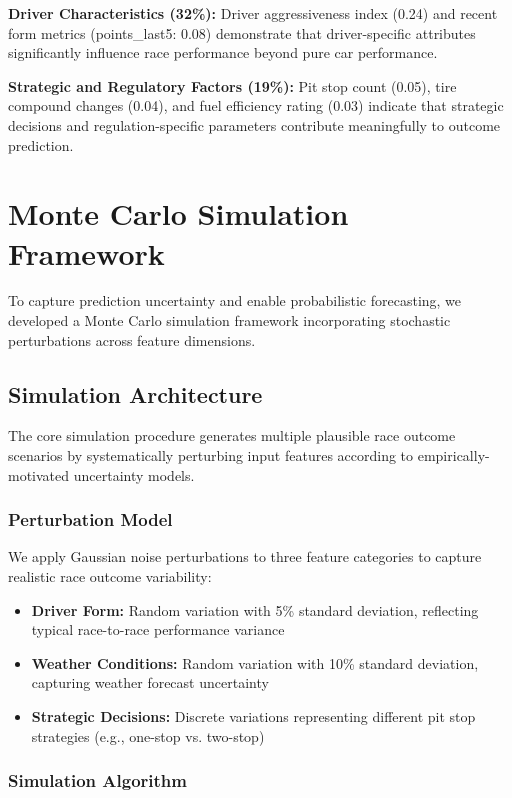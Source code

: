 \documentclass[conference]{IEEEtran}
\begin{document}
\textbf{Driver Characteristics (32\%):} Driver aggressiveness index (0.24) and recent form metrics (points\_last5: 0.08) demonstrate that driver-specific attributes significantly influence race performance beyond pure car performance.

\textbf{Strategic and Regulatory Factors (19\%):} Pit stop count (0.05), tire compound changes (0.04), and fuel efficiency rating (0.03) indicate that strategic decisions and regulation-specific parameters contribute meaningfully to outcome prediction.

\section{Monte Carlo Simulation Framework}

To capture prediction uncertainty and enable probabilistic forecasting, we developed a Monte Carlo simulation framework incorporating stochastic perturbations across feature dimensions.

\subsection{Simulation Architecture}

The core simulation procedure generates multiple plausible race outcome scenarios by systematically perturbing input features according to empirically-motivated uncertainty models.

\subsubsection{Perturbation Model}

We apply Gaussian noise perturbations to three feature categories to capture realistic race outcome variability:

\begin{itemize}
    \item \textbf{Driver Form:} Random variation with 5\% standard deviation, reflecting typical race-to-race performance variance
    \item \textbf{Weather Conditions:} Random variation with 10\% standard deviation, capturing weather forecast uncertainty
    \item \textbf{Strategic Decisions:} Discrete variations representing different pit stop strategies (e.g., one-stop vs. two-stop)
\end{itemize}

\subsubsection{Simulation Algorithm}
\end{document}
